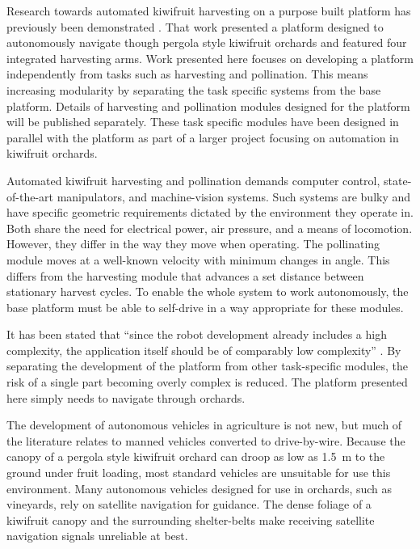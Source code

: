 \documentclass[preprint,authoryear,12pt]{elsarticle}
\begin{document}
    Research towards automated kiwifruit harvesting on a purpose built platform has previously been demonstrated \citep{Scarfe2012}.
    That work presented a platform designed to autonomously navigate though pergola style kiwifruit orchards and featured four integrated harvesting arms.
    Work presented here focuses on developing a platform independently from tasks such as harvesting and pollination.
    This means increasing modularity by separating the task specific systems from the base platform.
    Details of harvesting and pollination modules designed for the platform will be published separately.
    These task specific modules have been designed in parallel with the platform as part of a larger project focusing on automation in kiwifruit orchards.

    Automated kiwifruit harvesting and pollination demands computer control, state-of-the-art manipulators, and machine-vision systems.
    Such systems are bulky and have specific geometric requirements dictated by the environment they operate in.
    Both share the need for electrical power, air pressure, and a means of locomotion.
    However, they differ in the way they move when operating.
    The pollinating module moves at a well-known velocity with minimum changes in angle.
    This differs from the harvesting module that advances a set distance between stationary harvest cycles.
    To enable the whole system to work autonomously, the base platform must be able to self-drive in a way appropriate for these modules.

    It has been stated that ``since the robot development already includes a high complexity, the application itself should be of comparably low complexity'' \citep{Ruckelshausen2009}.
    By separating the development of the platform from other task-specific modules, the risk of a single part becoming overly complex is reduced.
    The platform presented here simply needs to navigate through orchards.

    The development of autonomous vehicles in agriculture is not new, but much of the literature relates to manned vehicles converted to drive-by-wire.
    Because the canopy of a pergola style kiwifruit orchard can droop as low as \SI{1.5}{\meter} to the ground under fruit loading, most standard vehicles are unsuitable for use this environment.
    Many autonomous vehicles designed for use in orchards, such as vineyards, rely on satellite navigation for guidance.
    The dense foliage of a kiwifruit canopy and the surrounding shelter-belts make receiving satellite navigation signals unreliable at best.
\end{document}
